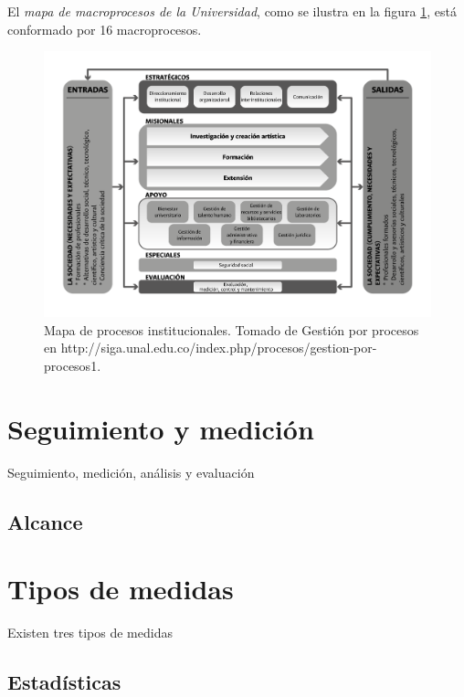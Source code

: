 \documentclass[]{book}
\begin{document}
El \emph{mapa de macroprocesos de la Universidad}, como se ilustra en la
figura \ref{fig:fig2}, está conformado por 16 macroprocesos.

\begin{figure}

{\centering \includegraphics[width=0.8\linewidth]{Imagenes/F_2} 

}

\caption{Mapa de procesos institucionales. Tomado de Gestión por procesos en http://siga.unal.edu.co/index.php/procesos/gestion-por-procesos1.}\label{fig:fig2}
\end{figure}

\hypertarget{medicion}{%
\chapter{Seguimiento y medición}\label{medicion}}

Seguimiento, medición, análisis y evaluación

\hypertarget{alcance}{%
\section{Alcance}\label{alcance}}

\hypertarget{medidas}{%
\chapter{Tipos de medidas}\label{medidas}}

Existen tres tipos de medidas

\hypertarget{estadisticas}{%
\section{Estadísticas}\label{estadisticas}}
\end{document}
